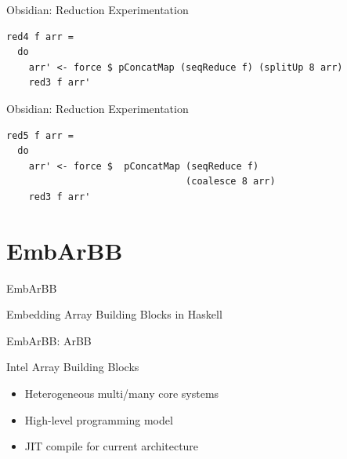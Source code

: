 \documentclass[xcolor=dvipsnames]{beamer}
\begin{document}
\begin{frame}[fragile]{Obsidian: Reduction Experimentation}

  \begin{block}{} 
    
\Fontvi
\begin{verbatim}
red4 f arr =
  do
    arr' <- force $ pConcatMap (seqReduce f) (splitUp 8 arr)
    red3 f arr' 
\end{verbatim} 
    
  \end{block}

\end{frame} 


\begin{frame}[fragile]{Obsidian: Reduction Experimentation}

  \begin{block}{} 
    
\Fontvi
\begin{verbatim}
red5 f arr =
  do
    arr' <- force $  pConcatMap (seqReduce f)
                                (coalesce 8 arr)
    red3 f arr' 
\end{verbatim} 
    
  \end{block}

\end{frame} 


    



%
\section{EmbArBB} 

\begin{frame}{EmbArBB} 
 \begin{center}
   {\Large Embedding Array Building Blocks in Haskell}
 \end{center}

\end{frame} 

%

\begin{frame}{EmbArBB: ArBB} 

  Intel Array Building Blocks
  \begin{itemize}
    \item Heterogeneous multi/many core systems
    \item High-level programming model 
    \item JIT compile for current architecture   
  \end{itemize}
\end{frame} 
\end{document}

